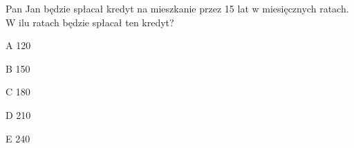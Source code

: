 \begin{tresc}
Pan Jan będzie spłacał kredyt na mieszkanie przez 15 lat w miesięcznych ratach. W ilu ratach będzie spłacał ten kredyt?
\end{tresc}
\begin{wariant}{A} 120 \end{wariant}
\begin{wariant}{B} 150 \end{wariant}
\begin{wariant}{C} 180 \end{wariant}
\begin{wariant}{D} 210 \end{wariant}
\begin{wariant}{E} 240 \end{wariant}
